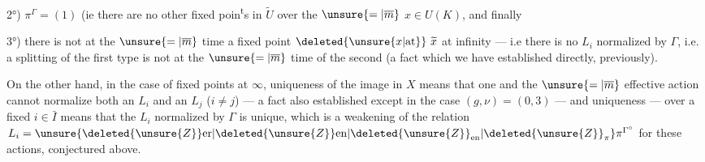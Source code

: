 2°) $\pi^\Gamma=(1)$ (ie there are no other
fixed poin\textsuperscript{t}s in $\widetilde U$ over the $\unsure{=|\overline m}$ $x\in U(K)$,
and finally

3°) there is not at the $\unsure{=|\overline m}$ time a fixed
point $\deleted{\unsure{x|\mathrm{at}}}\ \widetilde x$ at infinity --- i.e there is
no $L_i$ normalized by $\Gamma$, i.e. a splitting
of the first type is not at the $\unsure{=|\overline m}$ time
of the second (a fact which we have
established directly, previously).


On the other hand, in the case of fixed points
at $\infty$, uniqueness of the image in $X$
means that one and the $\unsure{=|\overline m}$ effective action cannot
normalize both an $L_i$ and an $L_j$
($i\ne j$) --- a fact also established except
in the case $(g,\nu)=(0,3)$ --- and uniqueness
--- over a fixed $i\in\bar I$ means
that the $L_i$  normalized by $\Gamma$ is unique,
which is a weakening of the
relation $L_i=\unsure{\deleted{\unsure{Z}}\mathrm{er}|\deleted{\unsure{Z}}\mathrm{en}|\deleted{\unsure{Z}}_{\mathrm{en}}|\deleted{\unsure{Z}}_{\pi}}\pi^{\Gamma^\circ}$
for these actions, conjectured above.
